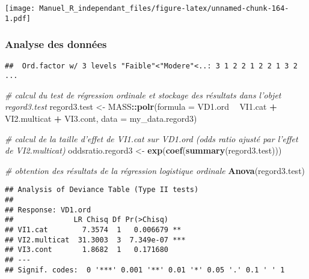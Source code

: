 \documentclass[
]{book}
\newenvironment{Shaded}{\begin{snugshade}}{\end{snugshade}}
\newcommand{\CommentTok}[1]{\textcolor[rgb]{0.56,0.35,0.01}{\textit{#1}}}
\newcommand{\DataTypeTok}[1]{\textcolor[rgb]{0.13,0.29,0.53}{#1}}
\newcommand{\KeywordTok}[1]{\textcolor[rgb]{0.13,0.29,0.53}{\textbf{#1}}}
\newcommand{\NormalTok}[1]{#1}
\newcommand{\OperatorTok}[1]{\textcolor[rgb]{0.81,0.36,0.00}{\textbf{#1}}}
\newcommand{\StringTok}[1]{\textcolor[rgb]{0.31,0.60,0.02}{#1}}
\begin{document}
\texttt{[image: Manuel\_R\_independant\_files/figure-latex/unnamed-chunk-164-1.pdf]}

\hypertarget{analyse-des-donnuxe9es-19}{%
\subsubsection{Analyse des données}\label{analyse-des-donnuxe9es-19}}

\begin{Shaded}
\end{Shaded}

\begin{verbatim}
##  Ord.factor w/ 3 levels "Faible"<"Modere"<..: 3 1 2 2 1 2 2 1 3 2 ...
\end{verbatim}

\begin{Shaded}
\begin{Highlighting}[]
\CommentTok{# calcul du test de régression ordinale et stockage des résultats dans l’objet regord3.test}
\NormalTok{regord3.test <-}\StringTok{ }\NormalTok{MASS}\OperatorTok{::}\KeywordTok{polr}\NormalTok{(}\DataTypeTok{formula =}\NormalTok{ VD1.ord }\OperatorTok{~}\StringTok{ }\NormalTok{VI1.cat }\OperatorTok{+}\StringTok{ }\NormalTok{VI2.multicat }\OperatorTok{+}\StringTok{ }\NormalTok{VI3.cont, }
                           \DataTypeTok{data =}\NormalTok{ my_data.regord3)}

\CommentTok{# calcul de la taille d'effet de VI1.cat sur VD1.ord (odds ratio ajusté par l'effet de VI2.multicat)}
\NormalTok{oddsratio.regord3 <-}\StringTok{ }\KeywordTok{exp}\NormalTok{(}\KeywordTok{coef}\NormalTok{(}\KeywordTok{summary}\NormalTok{(regord3.test)))}

\CommentTok{# obtention des résultats de la régression logistique ordinale}
\KeywordTok{Anova}\NormalTok{(regord3.test)}
\end{Highlighting}
\end{Shaded}

\begin{verbatim}
## Analysis of Deviance Table (Type II tests)
## 
## Response: VD1.ord
##              LR Chisq Df Pr(>Chisq)    
## VI1.cat        7.3574  1   0.006679 ** 
## VI2.multicat  31.3003  3  7.349e-07 ***
## VI3.cont       1.8682  1   0.171680    
## ---
## Signif. codes:  0 '***' 0.001 '**' 0.01 '*' 0.05 '.' 0.1 ' ' 1
\end{verbatim}
\end{document}
